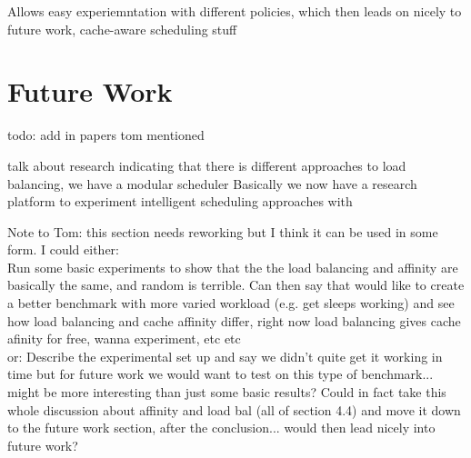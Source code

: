 \documentclass[bsc,frontabs,singlespacing,parskip,deptreport]{infthesis}
\begin{document}
Allows easy experiemntation with different policies, which then leads on nicely to future work, cache-aware scheduling stuff





\section{Future Work} \label{future-work}
todo: add in papers tom mentioned


talk about research indicating that there is different approaches to load balancing, we have a modular scheduler
Basically we now have a research platform to experiment intelligent scheduling approaches with

Note to Tom: this section needs reworking but I think it can be used in some form. I could either: \\
Run some basic experiments to show that the the load balancing and affinity are basically the same, and random is terrible. Can then say that would like to create a better benchmark with more varied workload (e.g. get sleeps working) and see how load balancing and cache affinity differ, right now load balancing gives cache afinity for free, wanna experiment, etc etc \\

or:
Describe the experimental set up and say we didn't quite get it working in time but for future work we would want to test on this type of benchmark... might be more interesting than just some basic results? Could in fact take this whole discussion about affinity and load bal (all of section 4.4) and move it down to the future work section, after the conclusion... would then lead nicely into future work?
\end{document}
